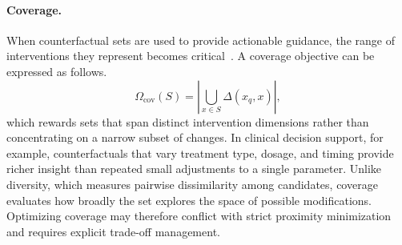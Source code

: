 \paragraph{Coverage.}
When counterfactual sets are used to provide actionable guidance, the range of interventions they represent becomes critical~\cite{wen2025enhancing}. A coverage objective can be expressed as follows.
\begingroup\small
\begin{equation}
\Omega_{\text{cov}}(S)
=
\left|
\bigcup_{x\in S}\Delta(x_q,x)
\right|,
\end{equation}
\endgroup
which rewards sets that span distinct intervention dimensions rather than concentrating on a narrow subset of changes. In clinical decision support, for example, counterfactuals that vary treatment type, dosage, and timing provide richer insight than repeated small adjustments to a single parameter. Unlike diversity, which measures pairwise dissimilarity among candidates, coverage evaluates how broadly the set explores the space of possible modifications. Optimizing coverage may therefore conflict with strict proximity minimization and requires explicit trade-off management.

